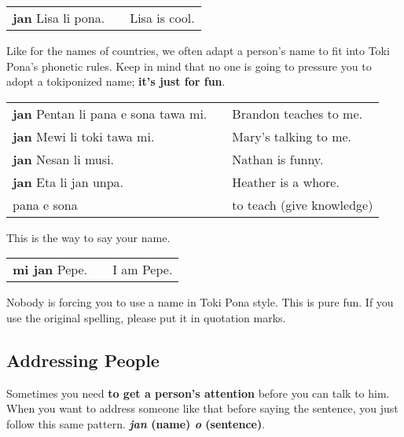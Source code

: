 \begin{supertabular}{p{5,5cm}|ll}
\textbf{jan} Lisa li pona. && Lisa is cool. \\
\end{supertabular} 

Like for the names of countries, we often adapt a person's name to fit into Toki Pona's phonetic rules. 
Keep in mind that no one is going to pressure you to adopt a tokiponized name; \textbf{it's just for fun}. 

\begin{supertabular}{p{5,5cm}|ll}
\textbf{jan} Pentan li pana e sona tawa mi. && Brandon teaches to me. \\
\textbf{jan} Mewi li toki tawa mi. && Mary's talking to me. \\
\textbf{jan} Nesan li musi. && Nathan is funny. \\
\textbf{jan} Eta li jan unpa. && Heather is a whore. \\
pana e sona && to teach (give knowledge) \\
\end{supertabular} 

This is the way to say your name. 

\begin{supertabular}{p{5,5cm}|ll}
\textbf{mi jan} Pepe. && I am Pepe. \\
\end{supertabular} 

Nobody is forcing you to use a name in Toki Pona style.
This is pure fun.
If you use the original spelling, please put it in quotation marks.
%
\subsection*{Addressing People}
%
Sometimes you need \textbf{to get a person's attention} before you can talk to him. 
When you want to address someone like that before saying the sentence, you just follow this same pattern. 
\textbf{\textit{jan} (name) \textit{o} (sentence)}. 

